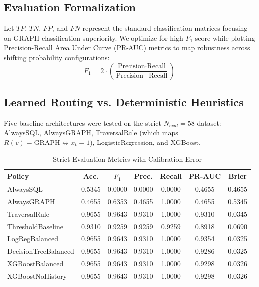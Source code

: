 \documentclass[conference]{IEEEtran}
\begin{document}
\subsection{Evaluation Formalization}
Let $TP$, $TN$, $FP$, and $FN$ represent the standard classification matrices focusing on GRAPH classification superiority. We optimize for high $F_1$-score while plotting Precision-Recall Area Under Curve (PR-AUC) metrics to map robustness across shifting probability configurations:
\begin{equation*}
F_1 = 2 \cdot \left( \frac{\text{Precision} \cdot \text{Recall}}{\text{Precision} + \text{Recall}} \right)
\end{equation*}

\subsection{Learned Routing vs. Deterministic Heuristics}
Five baseline architectures were tested on the strict $N_{eval}=58$ dataset: AlwaysSQL, AlwaysGRAPH, TraversalRule (which maps $R(v) = \text{GRAPH} \iff x_t = 1$), LogisticRegression, and XGBoost.

\begin{table}[h]
\centering
\caption{Strict Evaluation Metrics with Calibration Error}
\label{tab:metrics}
\begin{tabularx}{\columnwidth}{lcccccc}
\toprule
Policy & Acc. & $F_1$ & Prec. & Recall & PR-AUC & Brier \\
\midrule
AlwaysSQL & 0.5345 & 0.0000 & 0.0000 & 0.0000 & 0.4655 & 0.4655 \\
AlwaysGRAPH & 0.4655 & 0.6353 & 0.4655 & 1.0000 & 0.4655 & 0.5345 \\
TraversalRule & 0.9655 & 0.9643 & 0.9310 & 1.0000 & 0.9310 & 0.0345 \\
ThresholdBaseline & 0.9310 & 0.9259 & 0.9259 & 0.9259 & 0.8918 & 0.0690 \\
LogRegBalanced & 0.9655 & 0.9643 & 0.9310 & 1.0000 & 0.9354 & 0.0325 \\
DecisionTreeBalanced & 0.9655 & 0.9643 & 0.9310 & 1.0000 & 0.9286 & 0.0325 \\
XGBoostBalanced & 0.9655 & 0.9643 & 0.9310 & 1.0000 & 0.9298 & 0.0326 \\
XGBoostNoHistory & 0.9655 & 0.9643 & 0.9310 & 1.0000 & 0.9298 & 0.0326 \\
\bottomrule
\end{tabularx}
\end{table}
\end{document}
